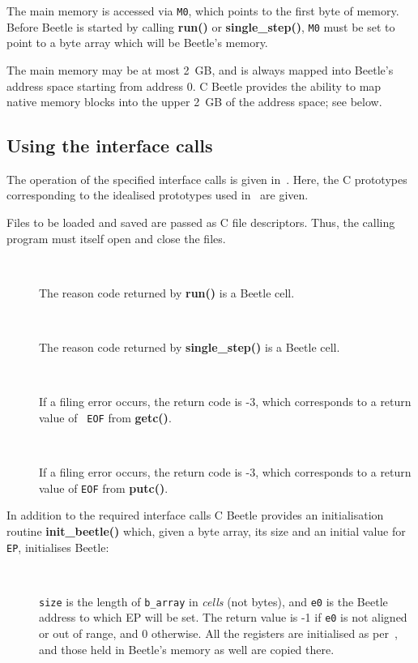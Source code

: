 \documentclass{article}
\newlength{\ifacewidth}\ifacewidth=\textwidth \advance\ifacewidth by -0.1in
\newlength{\innerwidth}\innerwidth=\ifacewidth \advance\innerwidth by -0.5in
\newcommand{\ifacec}[2]{\item[]\parbox{\ifacewidth}{\hspace*{2.5mm}{\tt #1}\\[0.5ex]\hspace*{0.4in}\parbox{\innerwidth}{#2}}}
\begin{document}
The main memory is accessed via {\tt M0}, which points to the first byte of
memory. Before Beetle is started by calling {\bf run()} or {\bf
single\_step()}, {\tt M0} must be set to point to a byte array which will be
Beetle's memory.

The main memory may be at most \SI{2}{GB}, and is always mapped into Beetle’s address space starting from address $0$. C Beetle provides the ability to map native memory blocks into the upper \SI{2}{GB} of the address space; see below.


\subsection{Using the interface calls}
\label{usingcalls}

The operation of the specified interface calls is given in~\cite{beetle}. Here, the C prototypes corresponding to the idealised prototypes used in~\cite{beetle} are given.

Files to be loaded and saved are passed as C file descriptors. Thus, the
calling program must itself open and close the files.

\begin{description}
\ifacec{CELL run()}{The reason code returned by {\bf run()} is a Beetle
cell.}
\ifacec{CELL single\_step()}{The reason code returned by {\bf single\_step()}
is a Beetle cell.}
\ifacec{int load\_object(FILE *file, CELL *address)}{If a filing error
occurs, the return code is -3, which corresponds to a return value of {\tt
EOF} from {\bf getc()}.}
\ifacec{int save\_object(FILE *file, CELL *address, UCELL length)}{If a
filing error occurs, the return code is -3, which corresponds to a return
value of {\tt EOF} from {\bf putc()}.}
\end{description}

In addition to the required interface calls C Beetle provides an initialisation routine {\bf init\_beetle()} which, given a byte array, its size and an initial value for {\tt EP}, initialises Beetle:

\begin{description}
\ifacec{int init\_beetle(BYTE *b\_array, long size, UCELL e0)}{{\tt size} is
the length of {\tt b\_array} in {\em cells} (not bytes), and {\tt e0} is the
Beetle address to which EP will be set. The return value is -1 if {\tt e0} is
not aligned or out of range, and 0 otherwise. All the registers are
initialised as per~\cite{beetle}, and those held in Beetle's memory as well
are copied there.}
\end{description}
\end{document}
